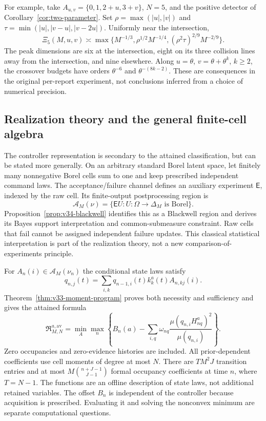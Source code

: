 For example, take $A_{u,v}=\{0,1,2+u,3+v\}$, $N=5$, and the positive
detector of Corollary~\ref{cor:two-parameter}. Set
$\rho=\max(|u|,|v|)$ and
$\tau=\min(|u|,|v-u|,|v-2u|)$. Uniformly near the intersection,
\[
 \Xi_5(M,u,v)\asymp
 \max\{M^{-1/3},\rho^{1/2}M^{-1/4},
                      (\rho^2\tau)^{2/9}M^{-2/9}\}.
\]
The peak dimensions are six at the intersection, eight on its three
collision lines away from the intersection, and nine elsewhere.
Along $u=\theta$, $v=\theta+\theta^k$, $k\ge2$, the crossover
budgets have orders $\theta^{-6}$ and $\theta^{-(8k-2)}$.
These are consequences in the original per-report experiment, not
conclusions inferred from a choice of numerical precision.

\subsection{Realization theory and the general finite-cell algebra}
The controller representation is secondary to the attained classification,
but can be stated more generally. On an arbitrary standard Borel latent
space, let finitely many nonnegative Borel cells sum to one and keep
prescribed independent command laws. The acceptance/failure channel
defines an auxiliary experiment $\mathsf E$, indexed by the raw cell.
Its finite-output postprocessing region is
\[
              \mathscr A_M(\nu)=\{\mathsf E U:U:\Omega\to\Delta_M
                                      \text{ is Borel}\}.
\]
Proposition~\ref{prop:v34-blackwell} identifies this as a Blackwell
region and derives its Bayes support interpretation and common-submeasure
constraint. Raw cells that fail cannot be assigned independent failure
updates. This classical statistical interpretation is part of the
realization theory, not a new comparison-of-experiments principle.

For $A_n(i)\in\mathscr A_M(\nu_n)$ the conditional state laws satisfy
\[
 q_{n,j}(t)=\sum_{i,k}q_{n-1,i}(t)k_k^a(t)A_{n,kj}(i).
\]
Theorem~\ref{thm:v33-moment-program} proves both necessity and
sufficiency and gives the attained formula
\[
 \mathfrak R_{M,N}^{a,\mathrm{av}}
 =\min_A\max_n\left\{B_n(a)-
     \sum_{i,q}\omega_{nq}
       \frac{\mu(q_{n,i}H_{nq}^a)^2}{\mu(q_{n,i})}\right\}.
\]
Zero occupancies and zero-evidence histories are included. All
prior-dependent coefficients use cell moments of degree at most $N$.
There are $TM^2J$ transition entries and at most
$M\binom{n+J-1}{J-1}$ formal occupancy coefficients at time $n$,
where $T=N-1$. The functions are an offline description of state laws,
not additional retained variables. The offset $B_n$ is independent of
the controller because acquisition is prescribed. Evaluating it and
solving the nonconvex minimum are separate computational questions.

